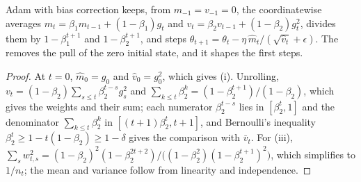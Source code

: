 \begin{refsection}
Adam with bias correction \parencite{KingmaBa2015} keeps, from $m_{-1}=v_{-1}=0$, the coordinatewise averages $m_t=\beta_1m_{t-1}+(1-\beta_1)g_t$ and $v_t=\beta_2v_{t-1}+(1-\beta_2)g_t^2$, divides them by $1-\beta_1^{t+1}$ and $1-\beta_2^{t+1}$, and steps $\theta_{t+1}=\theta_t-\eta\,\hat m_t/(\sqrt{\hat v_t}+\epsilon)$. The  removes the pull of the zero initial state, and it shapes the first steps.


\begin{proof}
At $t=0$, $\hat m_0=g_0$ and $\hat v_0=g_0^2$, which gives (i). Unrolling, $v_t=(1-\beta_2)\sum_{s\le t}\beta_2^{t-s}g_s^2$ and $\sum_{k\le t}\beta_2^k=(1-\beta_2^{t+1})/(1-\beta_2)$, which gives the weights and their sum; each numerator $\beta_2^{t-s}$ lies in $[\beta_2^t,1]$ and the denominator $\sum_{k\le t}\beta_2^k$ in $[(t+1)\beta_2^t,t+1]$, and Bernoulli's inequality $\beta_2^t\ge1-t(1-\beta_2)\ge1-\delta$ gives the comparison with $\bar v_t$. For (iii), $\sum_sw_{t,s}^2=(1-\beta_2)^2(1-\beta_2^{2t+2})/\bigl((1-\beta_2^2)(1-\beta_2^{t+1})^2\bigr)$, which simplifies to $1/n_t$; the mean and variance follow from linearity and independence.
\end{proof}


\end{refsection}
